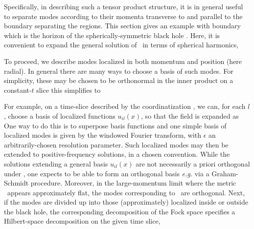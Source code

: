 Specifically, in describing such a tensor product structure,  it is in general useful to separate modes according to their momenta transverse to and parallel to the boundary separating the regions.  This section gives an example with boundary which is  the horizon of the spherically-symmetric black hole \schmet.  Here, it is convenient to expand the general solution of \slagr\ in terms of spherical harmonics,
%
\eqn{}

To proceed, we describe modes localized in both momentum and position (here radial).  In general there are many ways to choose a basis of such modes.  For simplicity, these may be chosen to be orthonormal in the inner product
%
\eqn{}
%
on a constant-$t$ slice this simplifies to
%
\eqn{}
%


For example, on a time-slice described by the coordinatization \admrad, we can, for each $l$, choose a basis of localized functions $u_{il}(x)$, so that the field is expanded as
%
\eqn{}
%
One way to do this is to superpose basis functions 
%
\eqn{}
%
 and one simple basis of localized modes is given by the windowed Fourier transform,
%
\eqn{}
%
with $\epsilon$ an arbitrarily-chosen resolution parameter.  Such localized modes may then be extended to positive-frequency solutions, in a chosen convention.  While the solutions extending a general basis  $u_{il}(x)$ are not necessarily a priori orthogonal under \innerprod, one expects to be able to form an orthogonal basis {\it e.g.} via a Graham-Schmidt procedure.  Moreover, in the large-momentum limit where the metric \admrad\ appears approximately flat, the modes corresponding to \uki\ are orthogonal.  
Next,  if the modes are divided up into those (approximately) localized inside or outside the black hole, the corresponding decomposition of the Fock space specifies a Hilbert-space decomposition on the given time slice,
%
\eqn{}
%

